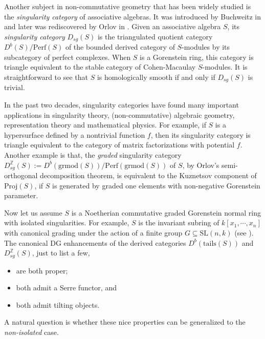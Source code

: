 \documentclass[11pt,reqno]{amsart}
\theoremstyle{definition}
\begin{document}

Another subject in non-commutative geometry that has been
widely studied is the {\it singularity category} of associative algebras.
It was introduced by Buchweitz in \cite{RB} and later was
rediscovered by Orlov in \cite{DR,DR1,DR2}.
Given an associative algebra $S$, 
its {\it  singularity category}
$D_{sg}(S)$ 
is the 
triangulated quotient category 
$D^{b}(S)/\mathrm{Perf}(S)$
of the bounded derived category of $S$-modules by its subcategory
of perfect complexes. When $S$ is a Gorenstein ring, this category is 
triangle equivalent to 
the stable category of Cohen-Macaulay $S$-modules.  
It is straightforward to see that
$S$ is homologically smooth if and only if $D_{sg}(S)$ is trivial.

In the past two decades, singularity categories 
have found many important applications
in singularity theory, (non-commutative) algebraic geometry, 
representation theory and mathematical physics.
For example,
if $S$ is a
hypersurface defined by
a nontrivial function $f$, then its singularity category is triangle
equivalent to the category of
matrix factorizations
with potential $f$. Another example is that, 
the {\it graded} singularity category 
$D_{sg}^{\mathbb Z}(S) 
:= D^{b}(\mathrm{grmod}(S))/\mathrm{Perf}(\mathrm{grmod}(S))$
of $S$,
by Orlov's semi-orthogonal decomposition theorem,
is equivalent to the Kuznetsov component of $\mathrm{Proj}(S)$, if 
$S$ is generated by graded one elements with non-negative Gorenstein parameter. 
 

Now let us assume
$S$ is a Noetherian commutative graded Gorenstein normal 
ring with isolated singularities.
For example, $S$ is the invariant subring of $k[x_1, \cdots, x_n]$
with canonical grading  
under the action of a finite group $G \subseteq \mathrm{SL}(n, k)$ (see \cite{IT}).  
The canonical DG enhancements of
the derived categories
$D^b(\mathrm{tails}(S))$
and $D_{sg}^{\mathbb Z}(S)$, just to list a few,
\begin{itemize}
\item[$-$] are both proper;
\item[$-$] both admit a Serre functor, and
\item[$-$] both admit tilting objects.
\end{itemize}
A natural question is
whether these 
nice properties can
be generalized to the {\it non-isolated} case.
\end{document}
